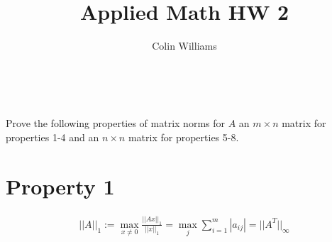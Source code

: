 \documentclass[10pt,a4paper]{article}
\title{Applied Math HW 2}
\author{Colin Williams}
\theoremstyle{definition}
\theoremstyle{definition}
\numberwithin{equation}{section}
\begin{document}
\maketitle


$ $
\begin{large}
\\Prove the following properties of matrix norms for $A$ an $m \times n$ matrix for properties 1-4 and an $n \times n$ matrix for properties 5-8. 
\end{large}

\section*{Property 1}
\begin{align*}
||A||_1 := \max_{x \neq 0} \frac{||Ax||_1}{||x||_1} = \max_j \sum_{i = 1}^m |a_{ij}| = ||A^T||_\infty
\end{align*}
\end{document}
